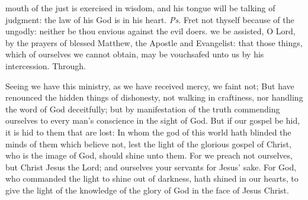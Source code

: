 \introit
{} mouth of the just is exercised in wisdom, and his tongue will be talking of judgment: the law of his God is in his heart. \textit{Ps.} Fret not thyself because of the ungodly: neither be thou envious against the evil doers.
\collect
 we be assisted, O Lord, by the prayers of blessed Matthew, the Apostle and Evangelist: that those things, which of ourselves we cannot obtain, may be vouchsafed unto us by his intercession. Through.

 Seeing we have this ministry, as we have received mercy, we faint not; But have renounced the hidden things of dishonesty, not walking in craftiness, nor handling the word of God deceitfully; but by manifestation of the truth commending ourselves to every man's conscience in the sight of God. But if our gospel be hid, it is hid to them that are lost: In whom the god of this world hath blinded the minds of them which believe not, lest the light of the glorious gospel of Christ, who is the image of God, should shine unto them. For we preach not ourselves, but Christ Jesus the Lord; and ourselves your servants for Jesus' sake. For God, who commanded the light to shine out of darkness, hath shined in our hearts, to give the light of the knowledge of the glory of God in the face of Jesus Christ.


